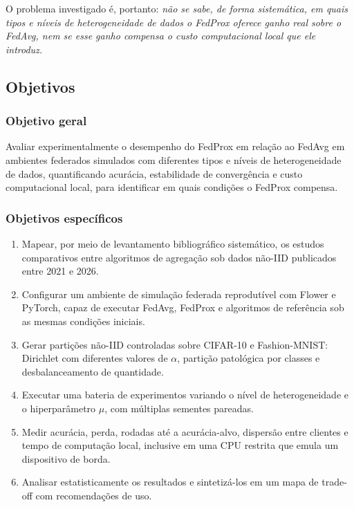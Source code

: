 O problema investigado é, portanto: \textit{não se sabe, de forma sistemática, em quais tipos e níveis de heterogeneidade de dados o FedProx oferece ganho real sobre o FedAvg, nem se esse ganho compensa o custo computacional local que ele introduz.}

\subsection{Objetivos}

\subsubsection{Objetivo geral}

Avaliar experimentalmente o desempenho do FedProx em relação ao FedAvg em ambientes federados simulados com diferentes tipos e níveis de heterogeneidade de dados, quantificando acurácia, estabilidade de convergência e custo computacional local, para identificar em quais condições o FedProx compensa.

\subsubsection{Objetivos específicos}

\begin{enumerate}[label=\textbf{OE\arabic*.}, leftmargin=*, itemsep=1pt]
    \item Mapear, por meio de levantamento bibliográfico sistemático, os estudos comparativos entre algoritmos de agregação sob dados não-IID publicados entre 2021 e 2026.
    \item Configurar um ambiente de simulação federada reprodutível com Flower e PyTorch, capaz de executar FedAvg, FedProx e algoritmos de referência sob as mesmas condições iniciais.
    \item Gerar partições não-IID controladas sobre CIFAR-10 e Fashion-MNIST: Dirichlet com diferentes valores de $\alpha$, partição patológica por classes e desbalanceamento de quantidade.
    \item Executar uma bateria de experimentos variando o nível de heterogeneidade e o hiperparâmetro $\mu$, com múltiplas sementes pareadas.
    \item Medir acurácia, perda, rodadas até a acurácia-alvo, dispersão entre clientes e tempo de computação local, inclusive em uma CPU restrita que emula um dispositivo de borda.
    \item Analisar estatisticamente os resultados e sintetizá-los em um mapa de trade-off com recomendações de uso.
\end{enumerate}

